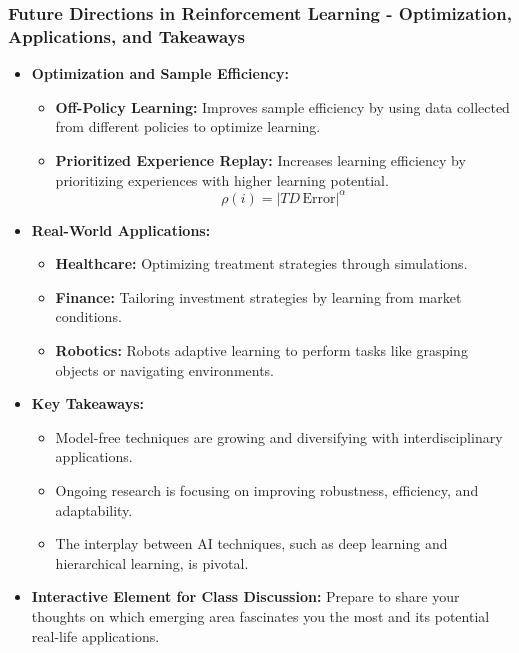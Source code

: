 \documentclass[aspectratio=169]{beamer}
\begin{document}
\begin{frame}[fragile]
    \frametitle{Future Directions in Reinforcement Learning - Optimization, Applications, and Takeaways}
    \begin{itemize}
        \item \textbf{Optimization and Sample Efficiency:}
        \begin{itemize}
            \item \textbf{Off-Policy Learning:} Improves sample efficiency by using data collected from different policies to optimize learning.
            \item \textbf{Prioritized Experience Replay:} Increases learning efficiency by prioritizing experiences with higher learning potential.
            \begin{equation}
                \rho(i) = |TD \, \text{Error}|^{\alpha}
            \end{equation}
        \end{itemize}

        \item \textbf{Real-World Applications:}
        \begin{itemize}
            \item \textbf{Healthcare:} Optimizing treatment strategies through simulations.
            \item \textbf{Finance:} Tailoring investment strategies by learning from market conditions.
            \item \textbf{Robotics:} Robots adaptive learning to perform tasks like grasping objects or navigating environments.
        \end{itemize}

        \item \textbf{Key Takeaways:}
        \begin{itemize}
            \item Model-free techniques are growing and diversifying with interdisciplinary applications.
            \item Ongoing research is focusing on improving robustness, efficiency, and adaptability.
            \item The interplay between AI techniques, such as deep learning and hierarchical learning, is pivotal.
        \end{itemize}

        \item \textbf{Interactive Element for Class Discussion:}
        Prepare to share your thoughts on which emerging area fascinates you the most and its potential real-life applications.
    \end{itemize}
\end{frame}
\end{document}
